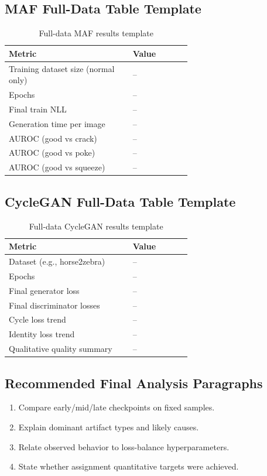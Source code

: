 \documentclass[conference]{IEEEtran}
\begin{document}
\subsection{MAF Full-Data Table Template}
\begin{table}[!t]
\centering
\caption{Full-data MAF results template}
\begin{tabular}{>{\raggedright}p{0.42\linewidth} >{\raggedleft\arraybackslash}p{0.20\linewidth}}
\toprule
Metric & Value \\
\midrule
Training dataset size (normal only) & -- \\
Epochs & -- \\
Final train NLL & -- \\
Generation time per image & -- \\
AUROC (good vs crack) & -- \\
AUROC (good vs poke) & -- \\
AUROC (good vs squeeze) & -- \\
\bottomrule
\end{tabular}
\end{table}

\subsection{CycleGAN Full-Data Table Template}
\begin{table}[!t]
\centering
\caption{Full-data CycleGAN results template}
\begin{tabular}{>{\raggedright}p{0.42\linewidth} >{\raggedleft\arraybackslash}p{0.20\linewidth}}
\toprule
Metric & Value \\
\midrule
Dataset (e.g., horse2zebra) & -- \\
Epochs & -- \\
Final generator loss & -- \\
Final discriminator losses & -- \\
Cycle loss trend & -- \\
Identity loss trend & -- \\
Qualitative quality summary & -- \\
\bottomrule
\end{tabular}
\end{table}

\subsection{Recommended Final Analysis Paragraphs}
\begin{enumerate}
\item Compare early/mid/late checkpoints on fixed samples.
\item Explain dominant artifact types and likely causes.
\item Relate observed behavior to loss-balance hyperparameters.
\item State whether assignment quantitative targets were achieved.
\end{enumerate}
\end{document}
